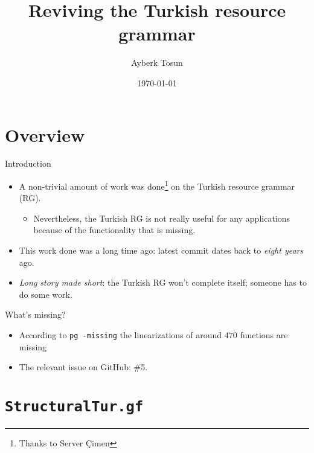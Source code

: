 \documentclass{beamer}
\title{Reviving the Turkish resource grammar}
\date{\today}
\author{Ayberk Tosun}
\institute{Fifth GF Summer School}
\begin{document}
  \maketitle

  \section{Overview}

  \begin{frame}{Introduction}
    \begin{itemize}
      \item<1-> A non-trivial amount of work was done\footnote{Thanks to Server
        \c{C}imen} on the Turkish resource grammar (RG).
        \begin{itemize}
          \item<2-> Nevertheless, the Turkish RG is not really useful for any
            applications because of the functionality that is missing.
        \end{itemize}
      \item<3-> This work done was a long time ago: latest commit dates back
        to \emph{eight years} ago.
      \item<4-> \emph{Long story made short}: the Turkish RG won't complete
        itself; someone has to do some work.
    \end{itemize}
  \end{frame}

  \begin{frame}{What's missing?}
    \begin{itemize}
      \item<1-> According to \texttt{pg -missing} the linearizations of around
        $470$ functions are missing
      \item<2-> The relevant issue on GitHub: \alert{\#5}.
    \end{itemize}
  \end{frame}

  \section{\texttt{StructuralTur.gf}}
\end{document}

